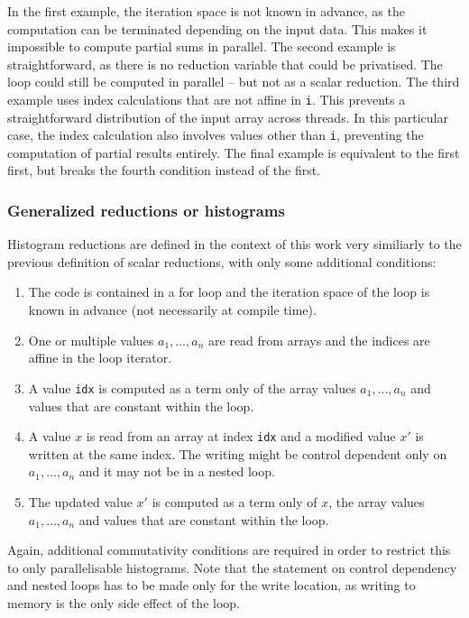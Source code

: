    In the first example, the iteration space is not known in advance, as the
    computation can be terminated depending on the input data.
    This makes it impossible to compute partial sums in parallel.
    The second example is straightforward, as there is no reduction variable
    that could be privatised.
    The loop could still be computed in parallel -- but not as a scalar
    reduction.
    The third example uses index calculations that are not affine in \texttt{i}.
    This prevents a straightforward distribution of the input array across
    threads.
    In this particular case, the index calculation also involves values other
    than \texttt{i}, preventing the computation of partial results entirely.
    The final example is equivalent to the first first, but breaks the fourth
    condition instead of the first.

\subsubsection{Generalized reductions or histograms}
\label{section:histocond}

    Histogram reductions are defined in the context of this work very similiarly
    to the previous definition of scalar reductions, with only some additional
    conditions:
    \begin{enumerate}
        \item The code is contained in a for loop and the iteration space of the
              loop is known in advance (not necessarily at compile time).
        \item One or multiple values $a_1,\dots,a_n$ are read from arrays and
              the indices are affine in the loop iterator.
        \item A value {\tt idx} is computed as a term only of the array values
              $a_1,\dots,a_n$ and values that are constant within the loop.
        \item A value $x$ is read from an array at index {\tt idx} and a
              modified value $x'$ is written at the same index.
              The writing might be control dependent only on $a_1,\dots,a_n$ and
              it may not be in a nested loop.
        \item The updated value $x'$ is computed as a term only of $x$, the
              array values $a_1,\dots,a_n$ and values that are constant within
              the loop.
    \end{enumerate}

    Again, additional commutativity conditions are required in order to restrict
    this to only parallelisable histograms.
    Note that the statement on control dependency and nested loops has to be
    made only for the write location, as writing to memory is the only side
    effect of the loop.

